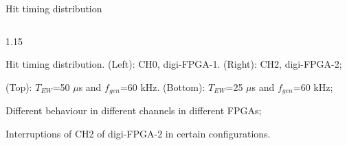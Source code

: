 \documentclass{beamer}
\begin{document}
\begin{frame}{Hit timing distribution}
\begin{columns}
\begin{column}{1.15\framewidth}
            \vspace{-0.5mm}
        
             \begin{itemize}
           {\footnotesize 
            \item Hit timing distribution. (Left): CH0, digi-FPGA-1. (Right): CH2, digi-FPGA-2;
             \item (Top): $T_{EW}$=50 $\mu$s and $f_{gen}$=60 kHz. (Bottom): $T_{EW}$=25 $\mu$s and $f_{gen}$=60 kHz;
             \item Different behaviour in different channels in different FPGAs;
             \vspace{-1mm}
                \item Interruptions of CH2 of digi-FPGA-2 in certain configurations.   }    
                 \end{itemize}
                 \end{column}
        \end{columns}   
    \end{frame}

    
\end{document}

